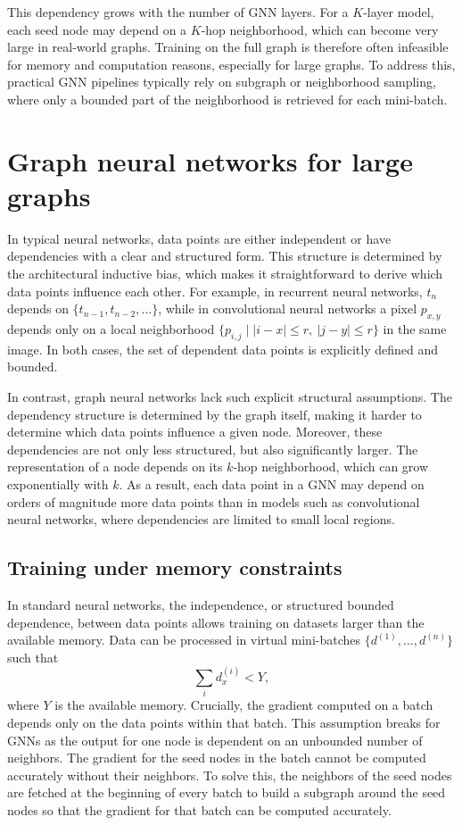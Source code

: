 \documentclass[PhD,single]{uclathes}
\begin{document}
This dependency grows with the number of GNN layers. For a $K$-layer model,
each seed node may depend on a $K$-hop neighborhood, which can become very
large in real-world graphs. Training on the full graph is therefore often
infeasible for memory and computation reasons, especially for large graphs. To
address this, practical GNN pipelines typically rely on subgraph or
neighborhood sampling, where only a bounded part of the neighborhood is
retrieved for each mini-batch.

\section{Graph neural networks for large graphs}
In typical neural networks, data points are either independent or have
dependencies with a clear and structured form. This structure is determined by
the architectural inductive bias, which makes it straightforward to derive
which data points influence each other. For example, in recurrent neural
networks, $t_n$ depends on $\{t_{n-1}, t_{n-2}, \dots\}$, while in
convolutional neural networks a pixel $p_{x,y}$ depends only on a local
neighborhood $\{p_{i,j} \mid |i-x| \le r,\ |j-y| \le r\}$ in the same image.
In both cases, the set of dependent data points is explicitly defined and
bounded.

In contrast, graph neural networks lack such explicit structural assumptions.
The dependency structure is determined by the graph itself, making it harder to
determine which data points influence a given node. Moreover, these
dependencies are not only less structured, but also significantly larger. The
representation of a node depends on its $k$-hop neighborhood, which can grow
exponentially with $k$. As a result, each data point in a GNN may depend on
orders of magnitude more data points than in models such as convolutional
neural networks, where dependencies are limited to small local regions.

\subsection{Training under memory constraints}
In standard neural networks, the independence, or structured bounded
dependence, between data points allows training on datasets larger than the
available memory. Data can be processed in virtual mini-batches
$\{d^{(1)}, \dots, d^{(n)}\}$ such that
\[
\sum_i d_x^{(i)} < Y,
\]
where $Y$ is the available memory. Crucially, the gradient computed on a batch
depends only on the data points within that batch. This assumption breaks for
GNNs as the output for one node is dependent on an unbounded number of
neighbors. The gradient for the seed nodes in the batch cannot be computed
accurately without their neighbors. To solve this, the neighbors of the seed
nodes are fetched at the beginning of every batch to build a subgraph around the
seed nodes so that the gradient for that batch can be computed accurately.
\end{document}
